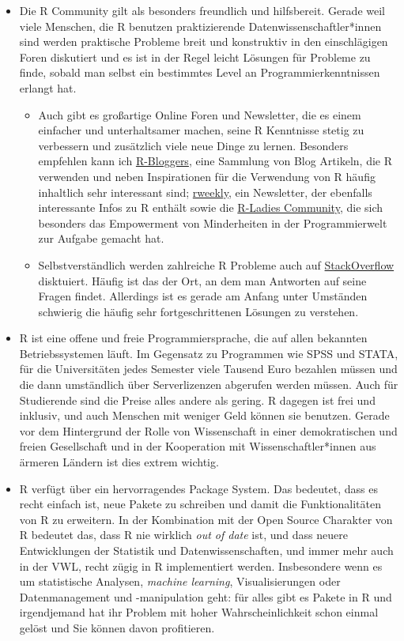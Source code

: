 \documentclass[]{book}
\providecommand{\tightlist}{%
  \setlength{\itemsep}{0pt}\setlength{\parskip}{0pt}}
\begin{document}
\begin{itemize}
\item
  Die R Community gilt als besonders freundlich und hilfsbereit. Gerade
  weil viele Menschen, die R benutzen praktizierende
  Datenwissenschaftler*innen sind werden praktische Probleme breit und
  konstruktiv in den einschlägigen Foren diskutiert und es ist in der
  Regel leicht Lösungen für Probleme zu finde, sobald man selbst ein
  bestimmtes Level an Programmierkenntnissen erlangt hat.

  \begin{itemize}
  \tightlist
  \item
    Auch gibt es großartige Online Foren und Newsletter, die es einem
    einfacher und unterhaltsamer machen, seine R Kenntnisse stetig zu
    verbessern und zusätzlich viele neue Dinge zu lernen. Besonders
    empfehlen kann ich \href{https://www.r-bloggers.com/}{R-Bloggers},
    eine Sammlung von Blog Artikeln, die R verwenden und neben
    Inspirationen für die Verwendung von R häufig inhaltlich sehr
    interessant sind; \href{https://rweekly.org/}{rweekly}, ein
    Newsletter, der ebenfalls interessante Infos zu R enthält sowie die
    \href{https://rladies.org/}{R-Ladies Community}, die sich besonders
    das Empowerment von Minderheiten in der Programmierwelt zur Aufgabe
    gemacht hat.
  \item
    Selbstverständlich werden zahlreiche R Probleme auch auf
    \href{https://stackoverflow.com/tags/r/info}{StackOverflow}
    disktuiert. Häufig ist das der Ort, an dem man Antworten auf seine
    Fragen findet. Allerdings ist es gerade am Anfang unter Umständen
    schwierig die häufig sehr fortgeschrittenen Lösungen zu verstehen.
  \end{itemize}
\item
  R ist eine offene und freie Programmiersprache, die auf allen
  bekannten Betriebssystemen läuft. Im Gegensatz zu Programmen wie SPSS
  und STATA, für die Universitäten jedes Semester viele Tausend Euro
  bezahlen müssen und die dann umständlich über Serverlizenzen abgerufen
  werden müssen. Auch für Studierende sind die Preise alles andere als
  gering. R dagegen ist frei und inklusiv, und auch Menschen mit weniger
  Geld können sie benutzen. Gerade vor dem Hintergrund der Rolle von
  Wissenschaft in einer demokratischen und freien Gesellschaft und in
  der Kooperation mit Wissenschaftler*innen aus ärmeren Ländern ist dies
  extrem wichtig.
\item
  R verfügt über ein hervorragendes Package System. Das bedeutet, dass
  es recht einfach ist, neue Pakete zu schreiben und damit die
  Funktionalitäten von R zu erweitern. In der Kombination mit der Open
  Source Charakter von R bedeutet das, dass R nie wirklich \emph{out of
  date} ist, und dass neuere Entwicklungen der Statistik und
  Datenwissenschaften, und immer mehr auch in der VWL, recht zügig in R
  implementiert werden. Insbesondere wenn es um statistische Analysen,
  \emph{machine learning}, Visualisierungen oder Datenmanagement und
  -manipulation geht: für alles gibt es Pakete in R und irgendjemand hat
  ihr Problem mit hoher Wahrscheinlichkeit schon einmal gelöst und Sie
  können davon profitieren.


\end{itemize}
\end{document}
